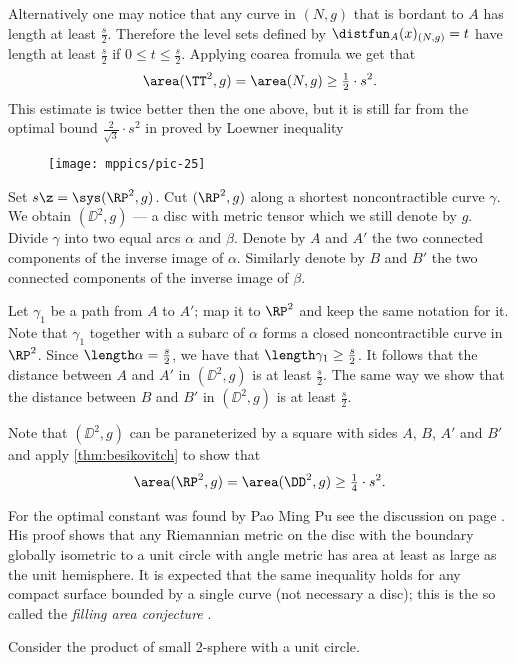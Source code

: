 Alternatively one may notice that any curve in $(N,g)$ that is bordant to $A$ has length at least $\tfrac s2$.
Therefore the level sets defined by $\distfun_A(x)_{(N,g)}=t$ have length at least $\tfrac s2$ if $0\le t\le \tfrac s2$.
Applying coarea fromula we get that
\[\area(\TT^2,g)=\area(N,g)\ge \tfrac12\cdot s^2.\]
This estimate is twice better then the one above, but it is still far from the optimal bound $\tfrac2{\sqrt{3}}\cdot s^2$ in proved by Loewner inequality

\begin{wrapfigure}{r}{44 mm}
\vskip-4mm
\centering
\texttt{[image: mppics/pic-25]}
\end{wrapfigure}

Set $s\z=\sys (\RP^2,g)$.
Cut $(\RP^2,g)$ along a shortest noncontractible curve $\gamma$.
We obtain $(\DD^2,g)$ --- a disc with metric tensor which we still denote by $g$.
Divide $\gamma$ into two equal arcs $\alpha$ and $\beta$.
Denote by $A$ and $A'$ the two connected components of the inverse image of $\alpha$.
Similarly denote by $B$ and $B'$ the two connected components of the inverse image of $\beta$.

Let $\gamma_1$ be a path from $A$ to $A'$;
map it to $\RP^2$ and keep the same notation for it.
Note that $\gamma_1$ together with a subarc of $\alpha$ forms a closed noncontractible curve in $\RP^2$.
Since $\length\alpha=\tfrac s2$, we have that $\length\gamma_1\ge \tfrac s2$.
It follows that the distance between $A$ and $A'$ in $(\DD^2,g)$ is at least $\tfrac s2$.
The same way we show that the distance between $B$ and $B'$ in $(\DD^2,g)$ is at least $\tfrac s2$.

Note that $(\DD^2,g)$ can be paraneterized by a square with sides $A$, $B$, $A'$ and $B'$ and apply \ref{thm:besikovitch} to show that 
\[\area(\RP^2,g)=\area(\DD^2,g)\ge \tfrac14\cdot s^2.\]

For the optimal constant was found by Pao Ming Pu see the discussion on page \pageref{page:pu}.
His proof shows that any Riemannian metric on the disc with the boundary globally isometric to a unit circle with angle metric has area at least as large as the unit hemisphere.
It is expected that the same inequality holds for any compact surface bounded by a single curve (not necessary a disc);
this is the so called the \emph{filling area conjecture} \cite[(e$'$)]{gromov-1983}.



 Consider the product of small 2-sphere with a unit circle.
